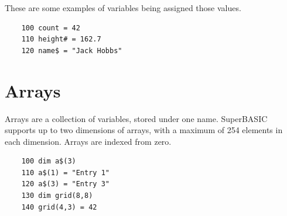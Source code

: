 These are some examples of variables being assigned those values.

\begin{verbatim}
	100 count = 42
	110 height# = 162.7
	120 name$ = "Jack Hobbs"
\end{verbatim}

\section{Arrays}

Arrays are a collection of variables, stored under one name. SuperBASIC supports up to two dimensions of arrays, with a maximum of 254 elements in each dimension. Arrays are indexed from zero.

\begin{verbatim}
	100 dim a$(3)
	110 a$(1) = "Entry 1"
	120 a$(3) = "Entry 3"
	130 dim grid(8,8)
	140 grid(4,3) = 42
\end{verbatim}
